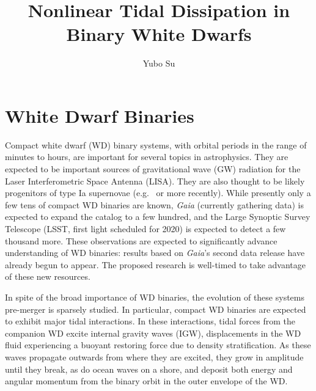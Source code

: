\documentclass[12pt,
        usenames, %
        dvipsnames %
    ]{article}
\begin{document}
\def\Snospace~{\S{}} %
\renewcommand*{\sectionautorefname}{\Snospace}
\renewcommand*{\appendixautorefname}{\Snospace}
\renewcommand*{\figureautorefname}{Fig.}
\renewcommand*{\equationautorefname}{Eq.}
\renewcommand*{\tableautorefname}{Tab.}

\singlespacing

\pagestyle{fancy}
\rhead{}
\cfoot{\thepage/\pageref{LastPage}}

\title{Nonlinear Tidal Dissipation in Binary White Dwarfs}
\author{Yubo Su}
\date{}

\maketitle

\section{White Dwarf Binaries}

Compact white dwarf (WD) binary systems, with orbital periods in the range of
minutes to hours, are important for several topics in astrophysics. They are
expected to be important sources of gravitational wave (GW) radiation for the
Laser Interferometric Space Antenna (LISA)\cite{lisa}. They are also thought to
be likely progenitors of type Ia supernovae (e.g.\ \cite{Ia0,webbink} or more
recently\cite{Ia1,Ia2}). While presently only a few tens of compact WD binaries are
known, \emph{Gaia} (currently gathering data) is expected to expand the catalog
to a few hundred, and the Large Synoptic Survey Telescope (LSST, first light
scheduled for 2020) is expected to detect a few thousand more\cite{lsst_wd}.
These observations are expected to significantly advance understanding of WD
binaries: results based on \emph{Gaia}'s second data release have already begun
to appear\cite{gaiaDD,gaiaDD2}. The proposed research is well-timed to take
advantage of these new resources.

In spite of the broad importance of WD binaries, the evolution of these systems
pre-merger is sparsely studied. In particular, compact WD binaries are expected
to exhibit major tidal interactions. In these interactions, tidal forces from
the companion WD excite internal gravity waves (IGW), displacements in the WD
fluid experiencing a buoyant restoring force due to density stratification.
As these waves propagate outwards from where they are excited, they grow in
amplitude until they break, as do ocean waves on a shore, and deposit both
energy and angular momentum from the binary orbit in the outer envelope of the
WD\@.
\end{document}
